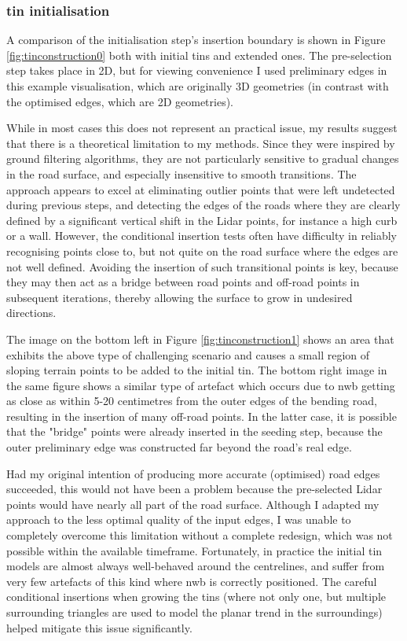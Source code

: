 \subsubsection{\ac{tin} initialisation}

A comparison of the initialisation step's insertion boundary is shown in Figure \ref{fig:tinconstruction0} both with initial \ac{tin}s and extended ones. The pre-selection step takes place in 2D, but for viewing convenience I used preliminary edges in this example visualisation, which are originally 3D geometries (in contrast with the optimised edges, which are 2D geometries).

While in most cases this does not represent an practical issue, my results suggest that there is a theoretical limitation to my methods. Since they were inspired by ground filtering algorithms, they are not particularly sensitive to gradual changes in the road surface, and especially insensitive to smooth transitions. The approach appears to excel at eliminating outlier points that were left undetected during previous steps, and detecting the edges of the roads where they are clearly defined by a significant vertical shift in the Lidar points, for instance a high curb or a wall. However, the conditional insertion tests often have difficulty in reliably recognising points close to, but not quite on the road surface where the edges are not well defined. Avoiding the insertion of such transitional points is key, because they may then act as a bridge between road points and off-road points in subsequent iterations, thereby allowing the surface to grow in undesired directions.

The image on the bottom left in Figure \ref{fig:tinconstruction1} shows an area that exhibits the above type of challenging scenario and causes a small region of sloping terrain points to be added to the initial \ac{tin}. The bottom right image in the same figure shows a similar type of artefact which occurs due to \ac{nwb} getting as close as within 5-20 centimetres from the outer edges of the bending road, resulting in the insertion of many off-road points. In the latter case, it is possible that the "bridge" points were already inserted in the seeding step, because the outer preliminary edge was constructed far beyond the road's real edge.

Had my original intention of producing more accurate (optimised) road edges succeeded, this would not have been a problem because the pre-selected Lidar points would have nearly all part of the road surface. Although I adapted my approach to the less optimal quality of the input edges, I was unable to completely overcome this limitation without a complete redesign, which was not possible within the available timeframe. Fortunately, in practice the initial \ac{tin} models are almost always well-behaved around the centrelines, and suffer from very few artefacts of this kind where \ac{nwb} is correctly positioned. The careful conditional insertions when growing the \ac{tin}s (where not only one, but multiple surrounding triangles are used to model the planar trend in the surroundings) helped mitigate this issue significantly.

